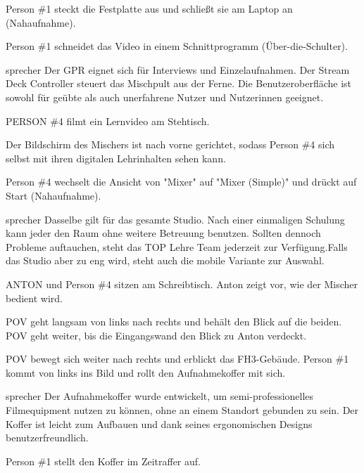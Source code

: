 \documentclass{screenplay}
\begin{document}
	Person \#1 steckt die Festplatte aus und schließt sie am Laptop an (Nahaufnahme).
	
	Person \#1 schneidet das Video in einem Schnittprogramm (Über-die-Schulter).
	
	\begin{dialogue}{sprecher}
		Der GPR eignet sich für Interviews und Einzelaufnahmen. Der Stream Deck Controller steuert das Mischpult aus der Ferne. Die Benutzeroberfläche ist sowohl für geübte als auch unerfahrene Nutzer und Nutzerinnen geeignet.
	\end{dialogue}
	
	PERSON \#4 filmt ein Lernvideo am Stehtisch.
	
	Der Bildschirm des Mischers ist nach vorne gerichtet, sodass Person \#4 sich selbst mit ihren digitalen Lehrinhalten sehen kann.
	
	Person \#4 wechselt die Ansicht von "Mixer" auf "Mixer (Simple)" und drückt auf Start (Nahaufnahme).
	
	\begin{dialogue}{sprecher}
		Dasselbe gilt für das gesamte Studio. Nach einer einmaligen Schulung kann jeder den Raum ohne weitere Betreuung benutzen. Sollten dennoch Probleme auftauchen, steht das TOP Lehre Team jederzeit zur Verfügung.Falls das Studio aber zu eng wird, steht auch die mobile Variante zur Auswahl.
	\end{dialogue}
	
	ANTON und Person \#4 sitzen am Schreibtisch. Anton zeigt vor, wie der Mischer bedient wird.
	
	POV geht langsam von links nach rechts und behält den Blick auf die beiden. POV geht weiter, bis die Eingangswand den Blick zu Anton verdeckt.
	
	
	POV bewegt sich weiter nach rechts und erblickt das FH3-Gebäude. Person \#1 kommt von links ins Bild und rollt den Aufnahmekoffer mit sich.
	
	\begin{dialogue}{sprecher}
		Der Aufnahmekoffer wurde entwickelt, um semi-professionelles Filmequipment nutzen zu können, ohne an einem Standort gebunden zu sein. Der Koffer ist leicht zum Aufbauen und dank seines ergonomischen Designs benutzerfreundlich.
	\end{dialogue}
	
	
	Person \#1 stellt den Koffer im Zeitraffer auf.
	
\end{document}
